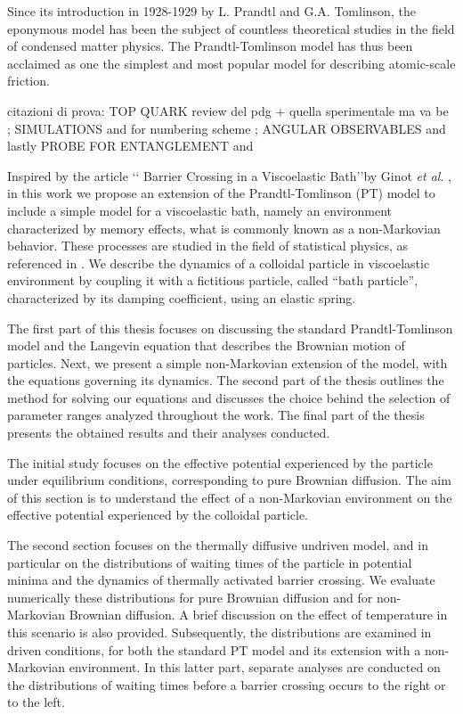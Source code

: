 Since its introduction in 1928-1929 by L. Prandtl and G.A. Tomlinson, the eponymous model has been the subject of countless theoretical studies in the field of condensed matter physics. The Prandtl-Tomlinson model has thus been acclaimed as one the simplest and most popular model for describing atomic-scale friction.

citazioni di prova: TOP QUARK review del pdg \cite{pdg2021} + quella sperimentale ma va be \cite{Husemann2017}; SIMULATIONS \cite{Alwall2011} and for numbering scheme \cite{pdg2009montecarlo}; ANGULAR OBSERVABLES \cite{Czakon2021} and lastly PROBE FOR ENTANGLEMENT \cite{Severi2022} and \cite{CMS2024} 

Inspired by the article \lq\lq
Barrier Crossing in a Viscoelastic Bath\rq\rq  \hspace{0.1cm}by Ginot \textit{et al}. \cite{ginot2022}, in this work we propose an extension of the Prandtl-Tomlinson (PT) model to include a simple model for a viscoelastic bath, namely an environment characterized by memory effects, what is commonly known as a non-Markovian behavior. These processes are studied in the field of statistical physics, as referenced in \cite{papoulis2002probability}. We describe the dynamics of a colloidal particle in viscoelastic environment by coupling it with a fictitious particle, called \textquotedblleft bath particle\textquotedblright, characterized by its damping coefficient, using an elastic spring.

The first part of this thesis focuses on discussing the standard Prandtl-Tomlinson model and the Langevin equation that describes the Brownian motion of particles. Next, we present a simple non-Markovian extension of the model, with the equations governing its dynamics. The second part of the thesis outlines the method for solving our equations and discusses the choice behind the selection of parameter ranges analyzed throughout the work. The final part of the thesis presents the obtained results and their analyses conducted. 

The initial study focuses on the effective potential experienced by the particle under equilibrium conditions, corresponding to pure Brownian diffusion. The aim of this section is to understand the effect of a non-Markovian environment on the effective potential experienced by the colloidal particle.

The second section focuses on the thermally diffusive undriven model, and in particular on the distributions of waiting times of the particle in potential minima and the dynamics of thermally activated barrier crossing. We evaluate numerically these distributions for pure Brownian diffusion and for non-Markovian Brownian diffusion. A brief discussion on the effect of temperature in this scenario is also provided. Subsequently, the distributions are examined in driven conditions, for both the standard PT model and its extension with a non-Markovian environment. In this latter part, separate analyses are conducted on the distributions of waiting times before a barrier crossing occurs to the right or to the left.

